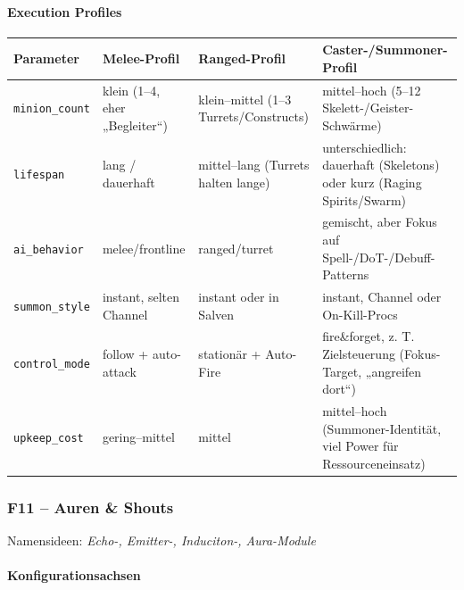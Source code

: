 \paragraph{Execution Profiles}{}
\scriptsize %
\begin{tabular}{p{3cm} | p{4cm} | p{4cm} | p{4cm}}
	Parameter        & Melee-Profil                                         & Ranged-Profil                                           & Caster-/Summoner-Profil                                                   \\
	\hline
	\texttt{minion\_count}   & klein (1–4, eher „Begleiter“)                        & klein–mittel (1–3 Turrets/Constructs)                   & mittel–hoch (5–12 Skelett-/Geister-Schwärme)                               \\
	\texttt{lifespan}       & lang / dauerhaft                                     & mittel–lang (Turrets halten lange)                      & unterschiedlich: dauerhaft (Skeletons) oder kurz (Raging Spirits/Swarm)   \\
	\texttt{ai\_behavior}    & melee/frontline                                      & ranged/turret                                           & gemischt, aber Fokus auf Spell-/DoT-/Debuff-Patterns                      \\
	\texttt{summon\_style}   & instant, selten Channel                              & instant oder in Salven                                  & instant, Channel oder On-Kill-Procs                                       \\
	\texttt{control\_mode}   & follow + auto-attack                                 & stationär + Auto-Fire                                   & fire\&forget, z. T. Zielsteuerung (Fokus-Target, „angreifen dort“)         \\
	\texttt{upkeep\_cost}    & gering–mittel                                        & mittel                                                  & mittel–hoch (Summoner-Identität, viel Power für Ressourceneinsatz)       \\
	\hline
\end{tabular}
\normalsize
\subsubsection{F11 – Auren \& Shouts}
Namensideen: \emph{Echo-, Emitter-, Induciton-, Aura-Module}

\paragraph{Konfigurationsachsen}{}

